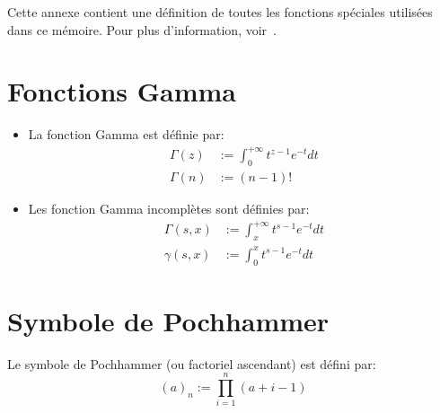 {}



\label{special_functions}
Cette annexe contient une définition de toutes les fonctions spéciales utilisées dans ce mémoire. Pour plus d'information, voir~\cite{NIST:DLMF}.
\section*{Fonctions Gamma}
\begin{itemize}
    \item La fonction Gamma est définie par:
    \[
        \begin{aligned}
            \Gamma(z)&:=\int_0^{+\infty}t^{z-1}e^{-t}dt \\
            \Gamma(n)&:=(n-1)!
        \end{aligned}
    \]
    \item Les fonction Gamma incomplètes sont définies par:
    \[
    \begin{aligned}
        \Gamma(s,x)&:=\int_x^{+\infty}t^{s-1}e^{-t}dt \\
        \gamma(s,x)&:=\int_0^x t^{s-1}e^{-t}dt
    \end{aligned}
    \] 
\end{itemize}
\section*{Symbole de Pochhammer}
Le symbole de Pochhammer (ou factoriel ascendant) est défini par:
\[
{(a)}_n:=\prod_{i=1}^n (a+i-1)
\]
